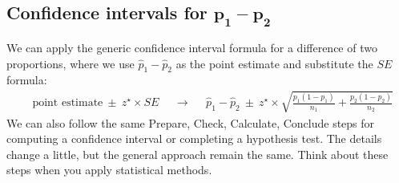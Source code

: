 

\subsection[Confidence intervals for $p_1 - p_2$]
    {Confidence intervals for $\pmb{p_1 - p_2}$}


\noindent%
We can apply the generic confidence interval formula
for a difference of two proportions,
where we use $\hat{p}_1 - \hat{p}_2$ as the point
estimate and substitute the $SE$ formula:
\begin{align*}
&\text{point estimate} \ \pm\  z^{\star} \times SE
&&\to
&&\hat{p}_1 - \hat{p}_2 \ \pm\ 
    z^{\star} \times
   \sqrt{\frac{p_1(1-p_1)}{n_1} + \frac{p_2(1-p_2)}{n_2}}
\end{align*}
We can also follow the same
Prepare, Check, Calculate, Conclude steps for
computing a confidence interval
or completing a hypothesis test.
The details change a little,
but the general approach remain the same.
Think about these steps when you apply statistical methods.

